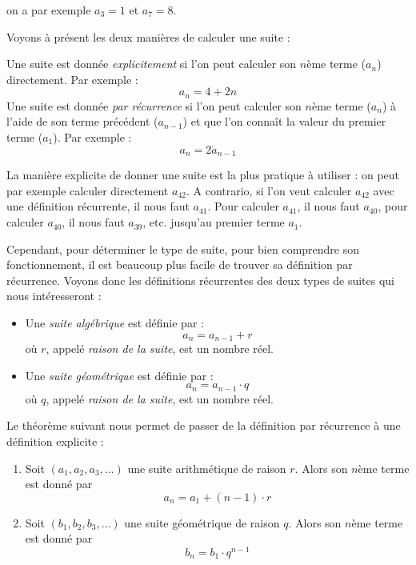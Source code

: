 on a par exemple $a_3 = 1$ et $a_7 = 8$.

Voyons à présent les deux manières de calculer une suite :

\begin{definition}
Une suite est donnée \emph{explicitement} si l'on peut calculer son $n$ème terme ($a_n$) directement. Par exemple :
$$
a_n = 4 + 2n
$$
Une suite est donnée \emph{par récurrence} si l'on peut calculer son $n$ème  terme ($a_n$) à l'aide de son terme précédent ($a_{n-1}$) et que l'on connaît la valeur du premier terme ($a_1$). Par exemple :
$$
a_n = 2\dot a_{n-1}
$$
\end{definition}

La manière explicite de donner une suite est la plus pratique à utiliser : on peut par exemple calculer directement $a_{42}$. A contrario, si l'on veut calculer $a_{42}$ avec une définition récurrente, il nous faut $a_{41}$. Pour calculer $a_{41}$, il nous faut $a_{40}$, pour calculer $a_{40}$, il nous faut $a_{39}$, etc. jusqu'au premier terme  $a_1$.

Cependant, pour déterminer le type de suite, pour bien comprendre son fonctionnement, il est beaucoup plus facile de trouver sa définition par récurrence. Voyons donc les définitions récurrentes des deux types de suites qui nous intéresseront :

\begin{definition}
\begin{itemize}
\item Une \emph{suite algébrique} est définie par :
$$
a_n = a_{n-1} + r
$$
où $r$, appelé \emph{raison de la suite}, est un nombre réel.
\item Une \emph{suite géométrique} est définie par :
$$
a_n = a_{n-1} \cdot q
$$
où $q$, appelé \emph{raison de la suite}, est un nombre réel.
\end{itemize}
\end{definition}

Le théorème suivant nous permet de passer de la définition par récurrence à une définition explicite :

\begin{theoreme}\label{thmsuites}
\begin{enumerate}
\item \label{thmarithmetique} Soit $(a_1, a_2, a_3, \dots)$ une suite arithmétique de raison $r$. Alors son $n$ème terme est donné par 
$$
a_n = a_1 + (n-1)\cdot r
$$
\item \label{thmgeometrique} Soit $(b_1, b_2, b_3, \dots)$ une suite géométrique de raison $q$. Alors son $n$ème terme est donné par 
$$
b_n = b_1 \cdot q^{n-1}
$$
\end{enumerate}
\end{theoreme}

